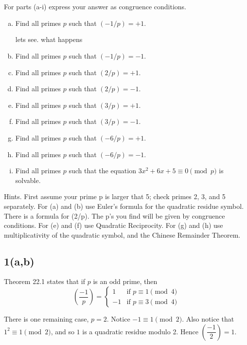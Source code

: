 \section{}

For parts (a-i) express your answer as congruence conditions.
\begin{enumerate}[(a)]
\item Find all primes $p$ such that $(-1/p) = +1$. 

lets see. what happens
\item Find all primes $p$ such that $(-1/p) = -1$. 
\item Find all primes $p$ such that $(2/p) = +1$.
\item Find all primes $p$ such that $(2/p) = -1$.
\item Find all primes $p$ such that $(3/p) = +1$.
\item Find all primes $p$ such that $(3/p) = -1$.
\item Find all primes $p$ such that $(-6/p) = +1$. 
\item Find all primes $p$ such that $(-6/p) = -1$. 
\item Find all primes $p$ such that the equation
$3x^2 + 6x + 5 \equiv 0 \pmod{p}$ is solvable.
\end{enumerate}

Hints.  First assume your prime p is larger that 5; check primes 2, 3, and 5 
separately.  For (a) and (b) use Euler's formula for the quadratic residue 
symbol. There is a formula for (2/p). The p's you find will be given by
congruence conditions. For (e) and (f) use Quadratic Reciprocity. For (g) and 
(h) use multiplicativity of the quadratic symbol, and the Chinese Remainder 
Theorem.


\subsection{1(a,b)}
Theorem 22.1 states that if $p$ is an odd prime, then
\[
\left( \frac{-1}{p} \right) =
\begin{cases}
	1  & \text{if } p \equiv 1 \pmod{4} \\
	-1 & \text{if } p \equiv 3 \pmod{4}
\end{cases}
\]

There is one remaining case, $p=2$. Notice $-1 \equiv 1 \pmod 2$. Also notice
that $1^2 \equiv 1 \pmod 2$, and so $1$ is a quadratic residue modulo 2. Hence
$\left( \dfrac{-1}{2} \right) = 1$.

